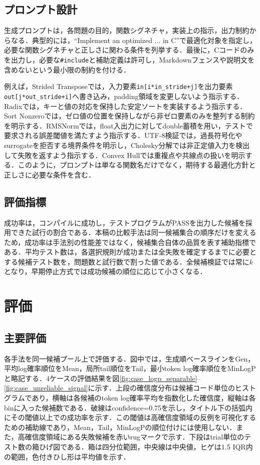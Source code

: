 \documentclass[submit,techrep,noauthor]{ipsj}
\begin{document}
\subsection{プロンプト設計}

生成プロンプトは，各問題の目的，関数シグネチャ，実装上の指示，出力制約からなる．典型的には，``Implement an optimized ... in C''で最適化対象を指定し，必要な関数シグネチャと正しさに関わる条件を列挙する．最後に，Cコードのみを出力し，必要な\texttt{\#include}と補助定義は許可し，Markdownフェンスや説明文を含めないという最小限の制約を付ける．

例えば，Strided Transposeでは，入力要素\texttt{in[i*in\_stride+j]}を出力要素\texttt{out[j*out\_stride+i]}へ書き込み，padding領域を変更しないよう指示する．Radixでは，キーと値の対応を保持した安定ソートを実装するよう指示する．Sort Nonzeroでは，ゼロ値の位置を保持しながら非ゼロ要素のみを整列する制約を明示する．RMSNormでは，float入出力に対してdouble蓄積を用い，テストで要求される誤差閾値を満たすよう指示する．UTF-8検証では，過長符号化やsurrogateを拒否する境界条件を明示し，Cholesky分解では非正定値入力を検出して失敗を返すよう指示する．Convex Hullでは重複点や共線点の扱いを明示する．このように，プロンプトは単なる関数名だけでなく，期待する最適化方針と正しさに必要な条件を含む．

\subsection{評価指標}

成功率は，コンパイルに成功し，テストプログラムがPASSを出力した候補を採用できた試行の割合である．本稿の比較手法は同一候補集合の順序だけを変えるため，成功率は手法別の性能差ではなく，候補集合自体の品質を表す補助指標である．平均テスト数は，各選択規則が成功または全失敗を確定するまでに必要とする候補テスト数を，問題数と試行数で割った値である．全候補検証では常に$k$となり，早期停止方式では成功候補の順位に応じて小さくなる．

\section{評価}


\subsection{主要評価}

各手法を同一候補プール上で評価する．図中では，生成順ベースラインをGen，平均log確率順位をMean，局所tail順位をTail，最小token log確率順位をMinLogPと略記する．4ケースの評価結果を図\ref{fig:case_logp_separable}--\ref{fig:case_unreliable_signal}に示す．上段の確信度分布は候補コード単位のヒストグラムであり，横軸は各候補のtoken log確率平均を指数化した確信度，縦軸は各binに入った候補数である．破線はconfidence=0.75を示し，タイトル下の括弧内にその閾値以上での成功率を示す．この閾値は高確信度領域の反例を可視化するための補助線であり，Mean，Tail，MinLogPの順位付けには使用しない．また，高確信度領域にある失敗候補を赤いrugマークで示す．下段はtrial単位のテスト数の箱ひげ図である．箱は四分位範囲，中央線は中央値，ヒゲは1.5 IQR内の範囲，色付きひし形は平均値を示す．
\end{document}
